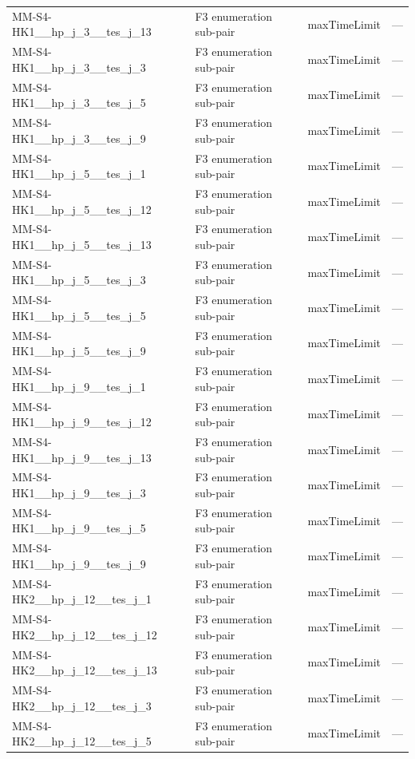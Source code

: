 \begin{table}[htbp]
\begin{tabular}{lllr}
  MM-S4-HK1\_\_hp\_j\_3\_\_tes\_j\_13 & F3 enumeration sub-pair & maxTimeLimit & — \\
  MM-S4-HK1\_\_hp\_j\_3\_\_tes\_j\_3 & F3 enumeration sub-pair & maxTimeLimit & — \\
  MM-S4-HK1\_\_hp\_j\_3\_\_tes\_j\_5 & F3 enumeration sub-pair & maxTimeLimit & — \\
  MM-S4-HK1\_\_hp\_j\_3\_\_tes\_j\_9 & F3 enumeration sub-pair & maxTimeLimit & — \\
  MM-S4-HK1\_\_hp\_j\_5\_\_tes\_j\_1 & F3 enumeration sub-pair & maxTimeLimit & — \\
  MM-S4-HK1\_\_hp\_j\_5\_\_tes\_j\_12 & F3 enumeration sub-pair & maxTimeLimit & — \\
  MM-S4-HK1\_\_hp\_j\_5\_\_tes\_j\_13 & F3 enumeration sub-pair & maxTimeLimit & — \\
  MM-S4-HK1\_\_hp\_j\_5\_\_tes\_j\_3 & F3 enumeration sub-pair & maxTimeLimit & — \\
  MM-S4-HK1\_\_hp\_j\_5\_\_tes\_j\_5 & F3 enumeration sub-pair & maxTimeLimit & — \\
  MM-S4-HK1\_\_hp\_j\_5\_\_tes\_j\_9 & F3 enumeration sub-pair & maxTimeLimit & — \\
  MM-S4-HK1\_\_hp\_j\_9\_\_tes\_j\_1 & F3 enumeration sub-pair & maxTimeLimit & — \\
  MM-S4-HK1\_\_hp\_j\_9\_\_tes\_j\_12 & F3 enumeration sub-pair & maxTimeLimit & — \\
  MM-S4-HK1\_\_hp\_j\_9\_\_tes\_j\_13 & F3 enumeration sub-pair & maxTimeLimit & — \\
  MM-S4-HK1\_\_hp\_j\_9\_\_tes\_j\_3 & F3 enumeration sub-pair & maxTimeLimit & — \\
  MM-S4-HK1\_\_hp\_j\_9\_\_tes\_j\_5 & F3 enumeration sub-pair & maxTimeLimit & — \\
  MM-S4-HK1\_\_hp\_j\_9\_\_tes\_j\_9 & F3 enumeration sub-pair & maxTimeLimit & — \\
  MM-S4-HK2\_\_hp\_j\_12\_\_tes\_j\_1 & F3 enumeration sub-pair & maxTimeLimit & — \\
  MM-S4-HK2\_\_hp\_j\_12\_\_tes\_j\_12 & F3 enumeration sub-pair & maxTimeLimit & — \\
  MM-S4-HK2\_\_hp\_j\_12\_\_tes\_j\_13 & F3 enumeration sub-pair & maxTimeLimit & — \\
  MM-S4-HK2\_\_hp\_j\_12\_\_tes\_j\_3 & F3 enumeration sub-pair & maxTimeLimit & — \\
  MM-S4-HK2\_\_hp\_j\_12\_\_tes\_j\_5 & F3 enumeration sub-pair & maxTimeLimit & — \\

\end{tabular}
\end{table}
